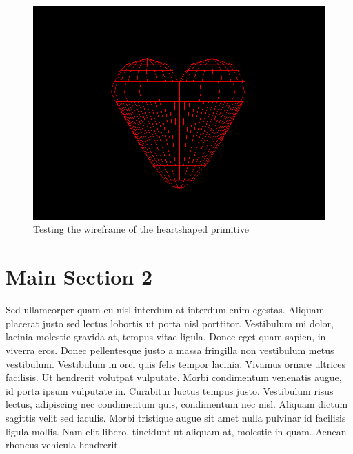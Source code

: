 \begin{figure}[htbp]
\centering
\includegraphics[trim=0.0cm 0.5cm 0.1cm 0.1cm, clip=true, totalheight=0.4\textheight]{Pictures/Wireframe.png}
\caption[Testing the wireframe of the heart­shaped primitive]{Testing the wireframe of the heart­shaped primitive}
\label{Wireframe}
\end{figure}


\section{Main Section 2}

Sed ullamcorper quam eu nisl interdum at interdum enim egestas. Aliquam placerat justo sed lectus lobortis ut porta nisl porttitor. Vestibulum mi dolor, lacinia molestie gravida at, tempus vitae ligula. Donec eget quam sapien, in viverra eros. Donec pellentesque justo a massa fringilla non vestibulum metus vestibulum. Vestibulum in orci quis felis tempor lacinia. Vivamus ornare ultrices facilisis. Ut hendrerit volutpat vulputate. Morbi condimentum venenatis augue, id porta ipsum vulputate in. Curabitur luctus tempus justo. Vestibulum risus lectus, adipiscing nec condimentum quis, condimentum nec nisl. Aliquam dictum sagittis velit sed iaculis. Morbi tristique augue sit amet nulla pulvinar id facilisis ligula mollis. Nam elit libero, tincidunt ut aliquam at, molestie in quam. Aenean rhoncus vehicula hendrerit.
